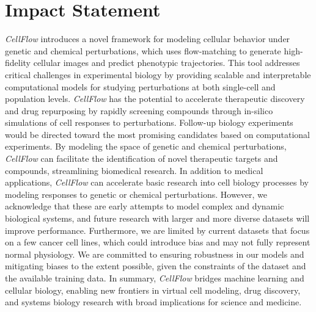 \documentclass{article}
\theoremstyle{plain}
\begin{document}
\printAffiliationsAndNotice{\icmlEqualContribution}









\newpage
\section*{Impact Statement}
\label{sec:impact}
\emph{CellFlow} introduces a novel framework for modeling cellular behavior under genetic and chemical perturbations, which uses flow-matching to generate high-fidelity cellular images and predict phenotypic trajectories. This tool addresses critical challenges in experimental biology by providing scalable and interpretable computational models for studying perturbations at both single-cell and population levels. \emph{CellFlow} has the potential to accelerate therapeutic discovery and drug repurposing by rapidly screening compounds through in-silico simulations of cell responses to perturbations. Follow-up biology experiments would be directed toward the most promising candidates based on computational experiments. By modeling the space of genetic and chemical perturbations, \emph{CellFlow} can facilitate the identification of novel therapeutic targets and compounds, streamlining biomedical research. In addition to medical applications, \emph{CellFlow} can accelerate basic research into cell biology processes by modeling responses to genetic or chemical perturbations. However, we acknowledge that these are early attempts to model complex and dynamic biological systems, and future research with larger and more diverse datasets will improve performance. Furthermore, we are limited by current datasets that focus on a few cancer cell lines, which could introduce bias and may not fully represent normal physiology. We are committed to ensuring robustness in our models and mitigating biases to the extent possible, given the constraints of the dataset and the available training data. In summary, \emph{CellFlow} bridges machine learning and cellular biology, enabling new frontiers in virtual cell modeling, drug discovery, and systems biology research with broad implications for science and medicine.



\newpage
\appendix
\onecolumn

\end{document}
